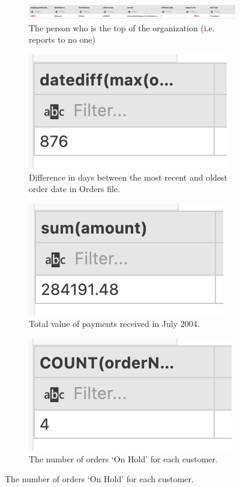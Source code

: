 \captionsetup{justification=centering}
\begin{figure}[htbp!]
    \begin{subfigure}{1\textwidth}
        \centering
        \includegraphics[width=\linewidth]{images/output/q1.png}
        \caption*{The person who is the top of the organization (i.e. reports to no one)}
        \label{fig:q1}
    \end{subfigure}
    \vspace*{20mm}
    \begin{subfigure}{.3\textwidth}
        \centering
        \includegraphics[width=.6\linewidth]{images/output/q2.png}
        \caption*{Difference in days between the most recent and oldest order date in Orders file.}
        \label{fig:q2}
    \end{subfigure}
    \begin{subfigure}{.3\textwidth}
        \centering
        \includegraphics[width=.6\linewidth]{images/output/q3.png}
        \caption*{Total value of  payments received in July 2004.}
        \label{fig:q3}
    \end{subfigure}
    \begin{subfigure}{.3\textwidth}
        \centering
        \includegraphics[width=.6\linewidth]{images/output/q6.png}
        \caption*{The number of orders ‘On Hold’ for each customer.}
        \label{fig:q6}
    \end{subfigure}


\end{figure}
